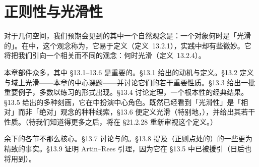 
\chapter{正则性与光滑性}
\label{ch:regularity-smoothness}

对于几何空间，我们预期会见到的其中一个自然观念是：一个对象何时是「光滑的」。在\trAlgebraicGeometry{}中，这个观念称为\trRegularity，它易于定义（定义~13.2.1），实践中却有些微妙。它将把我们引向一个相关而不同的观念：\trVariety{}何时光滑（定义~13.2.4）。

本章部件众多，其中 \S13.1--13.6 是重要的。\S13.1 给出\trZariski{}\trTangentSpace{}的动机与定义。\S13.2 定义\trRegularity{}与域上光滑——本章的中心课题——并讨论它们的若干重要性质。\S13.3 给出一批重要例子，多数以练习的形式出现。\S13.4 讨论\trBertini{}定理，一个根本性的经典结果。\S13.5 给出\trDVR{}的多种刻画，它在\trAlgebraicGeometry{}中扮演中心角色。既然已经看到「光滑性」是「相对」而非「绝对」观念的种种线索，\S13.6 便定义光滑\trMorphism（特别地，\trEtale{}\trMorphism），并给出其若干性质。（待我们知道得更多之后，将在 \S21.2.28 重新审视这个定义。）

余下的各节不那么核心。\S13.7 讨论\trSeparatedness{}与\trProperness{}的\trValuativeCriteria。\S13.8 提及\trRegular\trLocalRing（正则点处的\trLocalRing）的一些更为精致的事实。\S13.9 证明 Artin--Rees 引理，因为它在 \S13.5 中已被援引（日后也将用到）。











